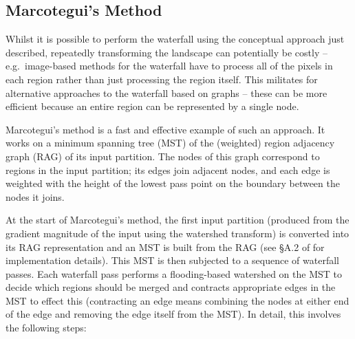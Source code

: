 \documentclass[review,a4paper]{elsarticle}
\begin{document}
\subsection{Marcotegui's Method}

Whilst it is possible to perform the waterfall using the conceptual approach just described, repeatedly transforming the landscape can potentially be costly -- e.g.~image-based methods for the waterfall have to process all of the pixels in each region rather than just processing the region itself. This militates for alternative approaches to the waterfall based on graphs -- these can be more efficient because an entire region can be represented by a single node.

Marcotegui's method \cite{marcotegui05} is a fast and effective example of such an approach. It works on a minimum spanning tree (MST) of the (weighted) region adjacency graph (RAG) of its input partition\footnotemark{}. The nodes of this graph correspond to regions in the input partition; its edges join adjacent nodes, and each edge is weighted with the height of the lowest pass point on the boundary between the nodes it joins.


At the start of Marcotegui's method, the first input partition (produced from the gradient magnitude of the input using the watershed transform) is converted into its RAG representation and an MST is built from the RAG (see \S{}A.2 of \cite{golodetz11} for implementation details). This MST is then subjected to a sequence of waterfall passes. Each waterfall pass performs a flooding-based watershed on the MST to decide which regions should be merged and contracts appropriate edges in the MST to effect this (contracting an edge means combining the nodes at either end of the edge and removing the edge itself from the MST). In detail, this involves the following steps:
\end{document}

